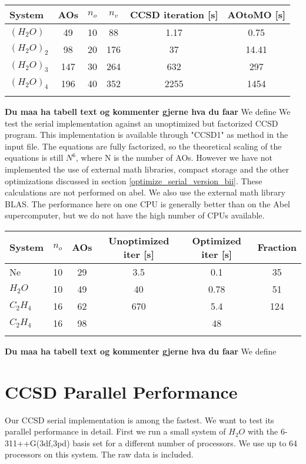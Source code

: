 \begin{center}
\begin{tabular}{ l c c c c c }
	\hline
  	System & AOs & $n_o$ & $n_v$ & CCSD iteration [s] & AOtoMO [s] \\ \hline
  	$(H_2O)$ & 49 & 10 & 88      & 1.17 & 0.75  \\ 
  	$(H_2O)_2$ & 98 & 20 & 176   & 37 & 14.41 \\ 
  	$(H_2O)_3$ & 147 & 30 & 264  & 632 & 297  \\
  	$(H_2O)_4$ & 196 & 40 & 352  & 2255 & 1454 \\ 
  	\hline
  	\\
	\end{tabular}
\end{center}
{\bf Du maa ha tabell text og kommenter gjerne hva du faar} We define
We test the serial implementation against an unoptimized but
factorized CCSD program. This implementation is available through
"CCSD1" as method in the input file. The equations are fully
factorized, so the theoretical scaling of the equations is still
$N^6$, where N is the number of AOs. However we have not implemented
the use of external math libraries, compact storage and the other
optimizations discussed in section
\ref{optimize_serial_version_bii}. These calculations are not
performed on abel. We also use the external math library BLAS. The
performance here on one CPU is generally better than on the Abel
supercomputer, but we do not have the high number of CPUs available.

\begin{center}
\begin{tabular}{ l c c c c c }
	\hline
  	System & $n_o$ & AOs & Unoptimized iter [s] & Optimized iter [s] & Fraction \\ \hline
  	Ne & 10 & 29 & 3.5 & 0.1 & 35 \\
  	$H_2O$ & 10 & 49 & 40 & 0.78 & 51 \\
  	$C_2H_4$ & 16 & 62 & 670 & 5.4 & 124 \\
  	$C_2H_4$ & 16 & 98 &  & 48 &  \\
  	\hline
  	\\
	\end{tabular}
\end{center}
{\bf Du maa ha tabell text og kommenter gjerne hva du faar} We define
\section{CCSD Parallel Performance}
Our CCSD serial implementation is among the fastest. We want to test
its parallel performance in detail. First we run a small system of
$H_2O$ with the 6-311++G(3df,3pd) basis set for a different number of
processors. We use up to 64 processors on this system. The raw data is
included.
   
